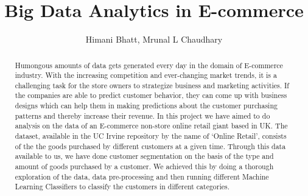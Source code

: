 

%



\title{Big Data Analytics in E-commerce}


\author{Himani Bhatt, Mrunal L Chaudhary}



\renewcommand{\shortauthors}{H. Bhatt, Mrunal C.}

\begin{abstract}
Humongous amounts of data gets generated every day in the domain of E-commerce industry. With the increasing competition and ever-changing market trends, it is a challenging task for the store owners to strategize business and marketing activities. If the companies are able to predict customer behavior, they can come up with business designs which can help them in making predictions about the customer purchasing patterns and thereby increase their revenue. In this project we have aimed to do analysis on the data of an E-commerce non-store online retail giant based in UK. The dataset, available in the UC Irvine repository by the name of `Online Retail', consists of the the goods purchased by different customers at a given time. Through this data available to us, we have done customer segmentation on the basis of the type and amount of goods purchased by a customer. We achieved this by doing a thorough exploration of the data, data pre-processing and then running different Machine Learning Classifiers to classify the customers in different categories.

\end{abstract}



\maketitle

